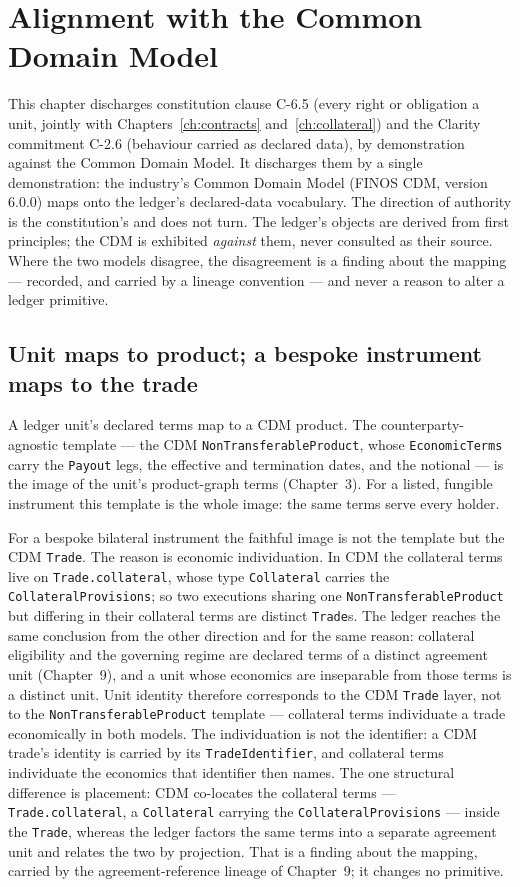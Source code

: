 \section{Alignment with the Common Domain Model}\label{ch:cdm}

This chapter discharges constitution clause C-6.5 (every right or obligation a unit, jointly with Chapters~\ref{ch:contracts} and~\ref{ch:collateral}) and the Clarity commitment C-2.6 (behaviour carried as declared data), by demonstration against the Common Domain Model. It discharges them by a
single demonstration: the industry's Common Domain Model (FINOS CDM, version
6.0.0) maps onto the ledger's declared-data vocabulary. The direction of
authority is the constitution's and does not turn. The ledger's objects are
derived from first principles; the CDM is exhibited \emph{against} them, never
consulted as their source. Where the two models disagree, the disagreement is a
finding about the mapping --- recorded, and carried by a lineage convention ---
and never a reason to alter a ledger primitive.

\subsection{Unit maps to product; a bespoke instrument maps to the trade}

A ledger unit's declared terms map to a CDM product. The counterparty-agnostic
template --- the CDM \texttt{NonTransferableProduct}, whose \texttt{EconomicTerms}
carry the \texttt{Payout} legs, the effective and termination dates, and the
notional --- is the image of the unit's product-graph terms (Chapter~3). For a
listed, fungible instrument this template is the whole image: the same terms
serve every holder.

For a bespoke bilateral instrument the faithful image is not the template but
the CDM \texttt{Trade}. The reason is economic individuation. In CDM the
collateral terms live on \texttt{Trade.collateral}, whose type
\texttt{Collateral} carries the \texttt{CollateralProvisions}; so two executions
sharing one \texttt{NonTransferableProduct} but differing in their collateral
terms are distinct \texttt{Trade}s. The ledger reaches the same conclusion from
the other direction and for the same reason: collateral eligibility and the
governing regime are declared terms of a distinct agreement unit
(Chapter~9), and a unit whose economics are inseparable from those terms is a
distinct unit. Unit identity therefore corresponds to the CDM \texttt{Trade}
layer, not to the \texttt{NonTransferableProduct} template --- collateral terms
individuate a trade economically in both models. The individuation is not the
identifier: a CDM trade's identity is carried by its \texttt{TradeIdentifier},
and collateral terms individuate the economics that identifier then names. The
one structural difference is placement: CDM co-locates the collateral terms ---
\texttt{Trade.collateral}, a \texttt{Collateral} carrying the
\texttt{CollateralProvisions} --- inside the \texttt{Trade}, whereas the ledger
factors the same terms into a separate agreement unit and relates the two by
projection. That is a finding about the mapping, carried by the
agreement-reference lineage of Chapter~9; it changes no primitive.

